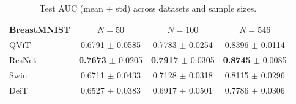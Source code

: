 \begin{table}[htbp]
\centering
\caption{Test AUC (mean $\pm$ std) across datasets and sample sizes.}
\label{tab:test_auc}
\begin{tabular}{lccc}
\toprule
\textbf{BreastMNIST} & $N = 50$ & $N = 100$ & $N = 546$ \\
\midrule
QViT & 0.6791 $\pm$ 0.0585 & 0.7783 $\pm$ 0.0254 & 0.8396 $\pm$ 0.0114 \\
ResNet & \textbf{0.7673} $\pm$ 0.0205 & \textbf{0.7917} $\pm$ 0.0305 & \textbf{0.8745} $\pm$ 0.0085 \\
Swin & 0.6711 $\pm$ 0.0433 & 0.7128 $\pm$ 0.0318 & 0.8115 $\pm$ 0.0296 \\
DeiT & 0.6527 $\pm$ 0.0383 & 0.6917 $\pm$ 0.0501 & 0.7786 $\pm$ 0.0306 \\
\bottomrule
\end{tabular}
\end{table}
